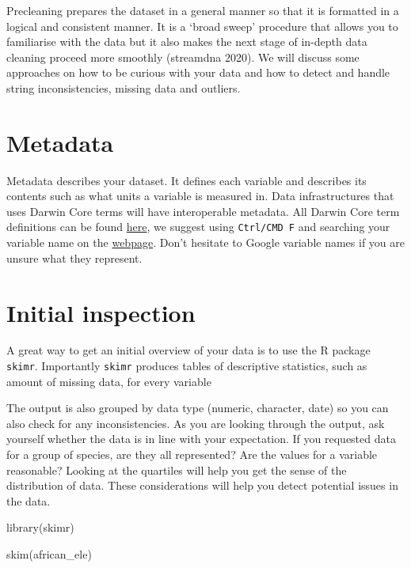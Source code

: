 \documentclass[
  letterpaper,
  DIV=11,
  numbers=noendperiod,
  oneside]{scrreprt}
\newenvironment{Shaded}{\begin{snugshade}}{\end{snugshade}}
\newcommand{\FunctionTok}[1]{\textcolor[rgb]{0.28,0.35,0.67}{#1}}
\newcommand{\NormalTok}[1]{\textcolor[rgb]{0.00,0.23,0.31}{#1}}
\begin{document}
Precleaning prepares the dataset in a general manner so that it is
formatted in a logical and consistent manner. It is a `broad sweep'
procedure that allows you to familiarise with the data but it also makes
the next stage of in-depth data cleaning proceed more smoothly
(streamdna 2020). We will discuss some approaches on how to be curious
with your data and how to detect and handle string inconsistencies,
missing data and outliers.

\hypertarget{metadata}{%
\section{Metadata}\label{metadata}}

Metadata describes your dataset. It defines each variable and describes
its contents such as what units a variable is measured in. Data
infrastructures that uses Darwin Core terms will have interoperable
metadata. All Darwin Core term definitions can be found
\href{https://dwc.tdwg.org/terms/}{here}, we suggest using
\texttt{Ctrl/CMD\ F} and searching your variable name on the
\href{https://dwc.tdwg.org/terms/}{webpage}. Don't hesitate to Google
variable names if you are unsure what they represent.

\hypertarget{initial-inspection}{%
\section{Initial inspection}\label{initial-inspection}}

A great way to get an initial overview of your data is to use the R
package \texttt{skimr}. Importantly \texttt{skimr} produces tables of
descriptive statistics, such as amount of missing data, for every
variable

The output is also grouped by data type (numeric, character, date) so
you can also check for any inconsistencies. As you are looking through
the output, ask yourself whether the data is in line with your
expectation. If you requested data for a group of species, are they all
represented? Are the values for a variable reasonable? Looking at the
quartiles will help you get the sense of the distribution of data. These
considerations will help you detect potential issues in the data.

\begin{Shaded}
\begin{Highlighting}[]
\FunctionTok{library}\NormalTok{(skimr)}

\FunctionTok{skim}\NormalTok{(african\_ele)}
\end{Highlighting}
\end{Shaded}
\end{document}
